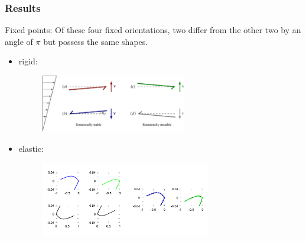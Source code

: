 \documentclass{beamer}
\begin{document}

\begin{frame}
	\frametitle{Results}
	\begin{overlayarea}{\textwidth}{\textheight}
		\vspace{-0.3cm}
	Fixed points: \small Of these four fixed orientations, two differ from the other two by an angle of $\pi$ but possess the same shapes.
	\begin{itemize} 
		\item rigid:
		\vspace{-0.3cm}
		\begin{figure}[htb]
			\begin{center}
				\includegraphics[width=0.6\textwidth]{plots/stone3.png}
			\end{center}
		\end{figure}\vspace{-0.3cm}
		\item elastic:\vspace{-0.3cm}
		\begin{figure}[htb]
			\begin{center}
				\includegraphics[width=0.7\textwidth]{plots/four_solutions2.png}
			\end{center}
		\end{figure}   
	\end{itemize}
	\end{overlayarea}
\end{frame}
\end{document}
